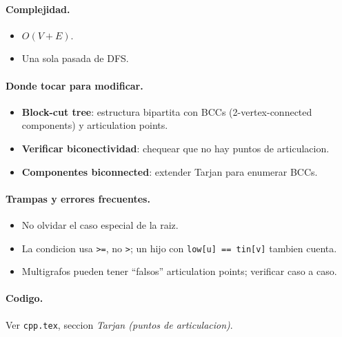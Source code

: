 \paragraph{Complejidad.}
\begin{itemize}\setlength\itemsep{0pt}
	\item $O(V + E)$.
	\item Una sola pasada de DFS.
\end{itemize}

\paragraph{Donde tocar para modificar.}
\begin{itemize}\setlength\itemsep{0pt}
	\item \textbf{Block-cut tree}: estructura bipartita con BCCs (2-vertex-connected components) y articulation points.
	\item \textbf{Verificar biconectividad}: chequear que no hay puntos de articulacion.
	\item \textbf{Componentes biconnected}: extender Tarjan para enumerar BCCs.
\end{itemize}

\paragraph{Trampas y errores frecuentes.}
\begin{itemize}\setlength\itemsep{0pt}
	\item No olvidar el caso especial de la raiz.
	\item La condicion usa \texttt{>=}, no \texttt{>}; un hijo con \texttt{low[u] == tin[v]} tambien cuenta.
	\item Multigrafos pueden tener ``falsos'' articulation points; verificar caso a caso.
\end{itemize}

\paragraph{Codigo.}
Ver \texttt{cpp.tex}, seccion \textit{Tarjan (puntos de articulacion)}.

\vspace{0.5em}
